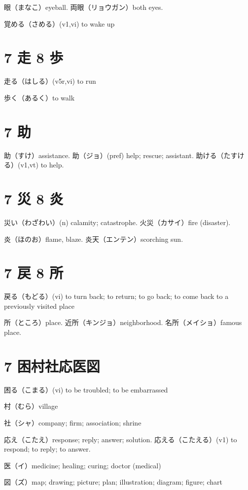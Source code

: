 眼（まなこ）eyeball.
両眼（リョウガン）both eyes.

覚める（さめる）(v1,vi) to wake up

\section{7 走 8 歩}

走る（はしる）(v5r,vi) to run

歩く（あるく）to walk

\section{7 助}

助（すけ）assistance.
助（ジョ）(pref) help; rescue; assistant.
助ける（たすける）(v1,vt) to help.

\section{7 災 8 炎}

災い（わざわい）(n) calamity; catastrophe.
火災（カサイ）fire (disaster).

炎（ほのお）flame, blaze.
炎天（エンテン）scorching sun.

\section{7 戻 8 所}

戻る（もどる）(vi) to turn back; to return; to go back;
to come back to a previously visited place

所（ところ）place.
近所（キンジョ）neighborhood.
名所（メイショ）famous place.

\section{7 困村社応医図}

困る（こまる）(vi) to be troubled; to be embarrassed

村（むら）village

社（シャ）company; firm; association; shrine

応え（こたえ）response; reply; answer; solution.
応える（こたえる）(v1) to respond; to reply; to answer.

医（イ）medicine; healing; curing; doctor (medical)

図（ズ）map; drawing; picture; plan; illustration; diagram; figure; chart

